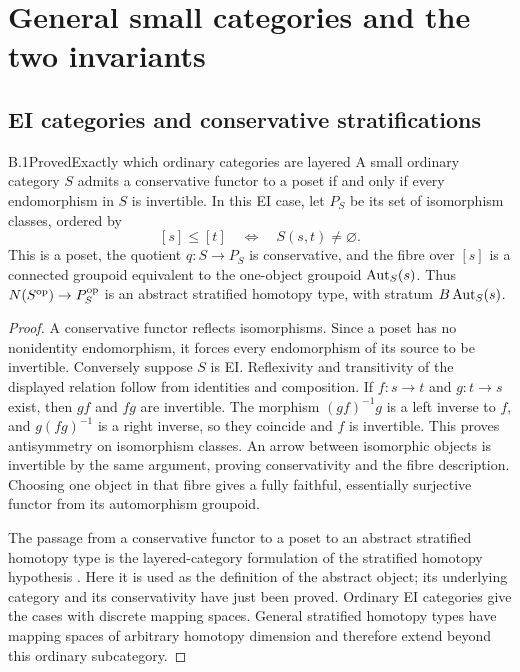 \section{General small categories and the two invariants}

\subsection{EI categories and conservative stratifications}

\begin{statement}{B.1}{Proved}{Exactly which ordinary categories are layered}
A small ordinary category $S$ admits a conservative functor to a poset
if and only if every endomorphism in $S$ is invertible. In this EI case,
let $P_S$ be its set of isomorphism classes, ordered by
\[
 [s]\leq[t]\quad\Longleftrightarrow\quad S(s,t)\ne\varnothing.
\]
This is a poset, the quotient $q:S\to P_S$ is conservative, and the fibre
over $[s]$ is a connected groupoid equivalent to the one-object groupoid
$\operatorname{Aut}_S(s)$. Thus $N(S^{\mathrm{op}})\to P_S^{\mathrm{op}}$ is an abstract stratified
homotopy type, with stratum $B\operatorname{Aut}_S(s)$.
\end{statement}
\begin{proof}
A conservative functor reflects isomorphisms. Since a poset has no
nonidentity endomorphism, it forces every endomorphism of its source to
be invertible. Conversely suppose $S$ is EI. Reflexivity and transitivity
of the displayed relation follow from identities and composition. If
$f:s\to t$ and $g:t\to s$ exist, then $gf$ and $fg$ are invertible.
The morphism $(gf)^{-1}g$ is a left inverse to $f$, and $g(fg)^{-1}$ is
a right inverse, so they coincide and $f$ is invertible. This proves
antisymmetry on isomorphism classes. An arrow between isomorphic objects
is invertible by the same argument, proving conservativity and the fibre
description. Choosing one object in that fibre gives a fully faithful,
essentially surjective functor from its automorphism groupoid.

The passage from a conservative functor to a poset to an abstract
stratified homotopy type is the layered-category formulation of the
stratified homotopy hypothesis \citep[\S\S2.1,2.3]{BGH2020}.
Here it is used as the definition of the abstract object; its underlying
category and its conservativity have just been proved. Ordinary EI
categories give the cases with discrete mapping spaces. General
stratified homotopy types have mapping spaces of arbitrary homotopy
dimension and therefore extend beyond this ordinary subcategory.
\end{proof}

